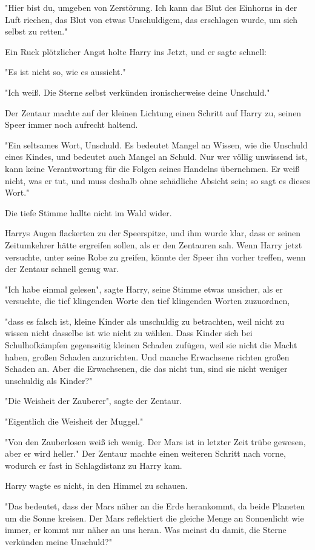 {"Hier bist du, umgeben von Zerstörung. Ich kann das Blut des Einhorns in der Luft riechen, das Blut von etwas Unschuldigem, das erschlagen wurde, um sich selbst zu retten."

Ein Ruck plötzlicher Angst holte Harry ins Jetzt, und er sagte schnell:

"Es ist nicht so, wie es aussieht."

"Ich weiß. Die Sterne selbst verkünden ironischerweise deine Unschuld."

Der Zentaur machte auf der kleinen Lichtung einen Schritt auf Harry zu, seinen Speer immer noch aufrecht haltend.

"Ein seltsames Wort, Unschuld. Es bedeutet Mangel an Wissen, wie die Unschuld eines Kindes, und bedeutet auch Mangel an Schuld. Nur wer völlig unwissend ist, kann keine Verantwortung für die Folgen seines Handelns übernehmen. Er weiß nicht, was er tut, und muss deshalb ohne schädliche Absicht sein; so sagt es dieses Wort."

Die tiefe Stimme hallte nicht im Wald wider.

Harrys Augen flackerten zu der Speerspitze, und ihm wurde klar, dass er seinen Zeitumkehrer hätte ergreifen sollen, als er den Zentauren sah. Wenn Harry jetzt versuchte, unter seine Robe zu greifen, könnte der Speer ihn vorher treffen, wenn der Zentaur schnell genug war.

"Ich habe einmal gelesen", sagte Harry, seine Stimme etwas unsicher, als er versuchte, die tief klingenden Worte den tief klingenden Worten zuzuordnen,

"dass es falsch ist, kleine Kinder als unschuldig zu betrachten, weil nicht zu wissen nicht dasselbe ist wie nicht zu wählen. Dass Kinder sich bei Schulhofkämpfen gegenseitig kleinen Schaden zufügen, weil sie nicht die Macht haben, großen Schaden anzurichten. Und manche Erwachsene richten großen Schaden an. Aber die Erwachsenen, die das nicht tun, sind sie nicht weniger unschuldig als Kinder?"

"Die Weisheit der Zauberer", sagte der Zentaur.

"Eigentlich die Weisheit der Muggel."

"Von den Zauberlosen weiß ich wenig. Der Mars ist in letzter Zeit trübe gewesen, aber er wird heller." Der Zentaur machte einen weiteren Schritt nach vorne, wodurch er fast in Schlagdistanz zu Harry kam.

Harry wagte es nicht, in den Himmel zu schauen.

"Das bedeutet, dass der Mars näher an die Erde herankommt, da beide Planeten um die Sonne kreisen. Der Mars reflektiert die gleiche Menge an Sonnenlicht wie immer, er kommt nur näher an uns heran. Was meinst du damit, die Sterne verkünden meine Unschuld?"

}
